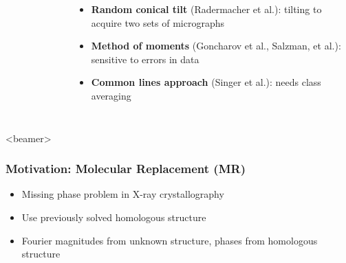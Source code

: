 \documentclass{beamer}
\begin{document}
\begin{frame}
\begin{columns}
\begin{figure}
\end{figure}
\begin{itemize}
 \item \textbf{Random conical tilt} (Radermacher et al.): tilting to acquire two sets of micrographs
 \item \textbf{Method of moments} (Goncharov et al., Salzman, et al.): sensitive to errors in data
 \item \textbf{Common lines approach} (Singer et al.): needs class averaging
\end{itemize}
\end{columns}
\end{frame}

\begin{frame}<beamer>
\frametitle{Motivation: Molecular Replacement (MR)}
\begin{itemize}
\item Missing phase problem in X-ray crystallography
\item Use previously solved homologous structure
\item Fourier magnitudes from unknown structure, phases from homologous structure
\end{itemize}
\end{frame}
\end{document}
